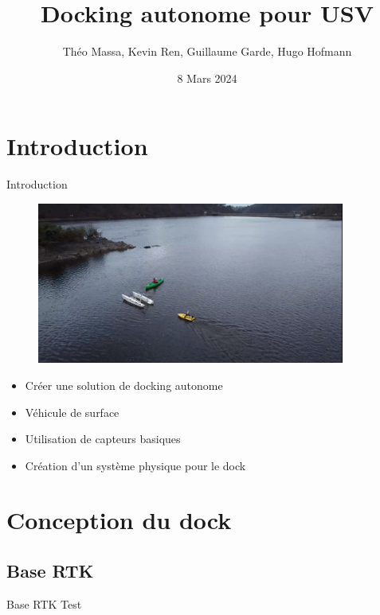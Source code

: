 \documentclass[pdftex,beamer,aspectratio=169]{beamer}
\title[Docking]{Docking autonome pour USV}
\author[]{Théo Massa, Kevin Ren, Guillaume Garde, Hugo Hofmann}
\date{8 Mars 2024}
\institute{ENSTA Bretagne-Lab STICC-Université Bretagne Sud}
\theoremstyle{definition}
\theoremstyle{example}
\theoremstyle{plain}
\begin{document}
\frame{\titlepage}

\begin{frame}[allowframebreaks]
  \tableofcontents
\end{frame}

\section{Introduction} 
\begin{frame}{Introduction}
  \begin{minipage}{0.6\textwidth}
    \begin{figure}
      \centering
      \includegraphics[width=0.9\textwidth]{img_lac.png}
    \end{figure}
  \end{minipage}\hfill
  \begin{minipage}{0.39\textwidth}
    \begin{itemize}
      \item Créer une solution de docking autonome
      \item Véhicule de surface
      \item Utilisation de capteurs basiques
      \item Création d'un système physique pour le dock
    \end{itemize}
  \end{minipage}
\end{frame}

\section{Conception du dock}

\subsection{Base RTK}
\begin{frame}[fragile]{Base RTK}
  Test
\end{frame}
\end{document}
